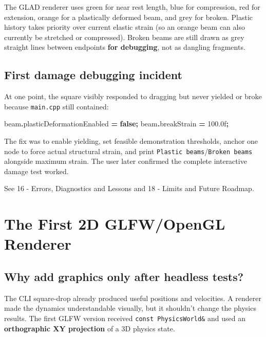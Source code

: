 \documentclass[
  10pt,
  a4paper,
]{article}
\newenvironment{Shaded}{\begin{snugshade}}{\end{snugshade}}
\newcommand{\BuiltInTok}[1]{#1}
\newcommand{\FloatTok}[1]{\textcolor[rgb]{0.00,0.00,0.81}{#1}}
\newcommand{\KeywordTok}[1]{\textcolor[rgb]{0.13,0.29,0.53}{\textbf{#1}}}
\newcommand{\NormalTok}[1]{#1}
\newcommand{\OperatorTok}[1]{\textcolor[rgb]{0.81,0.36,0.00}{\textbf{#1}}}
\begin{document}
The GLAD renderer uses green for near rest length, blue for compression,
red for extension, orange for a plastically deformed beam, and grey for
broken. Plastic history takes priority over current elastic strain (so
an orange beam can also currently be stretched or compressed). Broken
beams are still drawn as grey straight lines between endpoints
\textbf{for debugging}, not as dangling fragments.

\subsection{First damage debugging
incident}\label{first-damage-debugging-incident}

At one point, the square visibly responded to dragging but never yielded
or broke because \texttt{main.cpp} still contained:

\begin{Shaded}
\begin{Highlighting}[]
\NormalTok{beam}\OperatorTok{.}\NormalTok{plasticDeformationEnabled }\OperatorTok{=} \KeywordTok{false}\OperatorTok{;}
\NormalTok{beam}\OperatorTok{.}\NormalTok{breakStrain }\OperatorTok{=} \FloatTok{100.0}\BuiltInTok{f}\OperatorTok{;}
\end{Highlighting}
\end{Shaded}

The fix was to enable yielding, set feasible demonstration thresholds,
anchor one node to force actual structural strain, and print
\texttt{Plastic\ beams}/\texttt{Broken\ beams} alongside maximum strain.
The user later confirmed the complete interactive damage test worked.

See 16 - Errors, Diagnostics and Lessons and 18 - Limits and Future
Roadmap.

\newpage

\section{The First 2D GLFW/OpenGL
Renderer}\label{the-first-2d-glfwopengl-renderer}

\subsection{Why add graphics only after headless
tests?}\label{why-add-graphics-only-after-headless-tests}

The CLI square-drop already produced useful positions and velocities. A
renderer made the dynamics understandable visually, but it shouldn't
change the physics results. The first GLFW version received
\texttt{const\ PhysicsWorld\&} and used an \textbf{orthographic XY
projection} of a 3D physics state.
\end{document}
